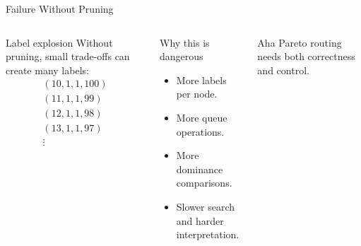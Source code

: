 \documentclass[aspectratio=169]{beamer}
\begin{document}
\begin{frame}{Failure Without Pruning}
    \begin{columns}[T]
        \begin{block}{Label explosion}
            Without pruning, small trade-offs can create many labels:
            \[
            \begin{array}{c}
            (10,1,1,100)\\
            (11,1,1,99)\\
            (12,1,1,98)\\
            (13,1,1,97)\\
            \vdots
            \end{array}
            \]
        \end{block}

        \begin{alertblock}{Why this is dangerous}
            \begin{itemize}
                \item More labels per node.
                \item More queue operations.
                \item More dominance comparisons.
                \item Slower search and harder interpretation.
            \end{itemize}
        \end{alertblock}

        \begin{block}{Aha}
            Pareto routing needs both correctness and control.
        \end{block}
    \end{columns}
\end{frame}
\end{document}
